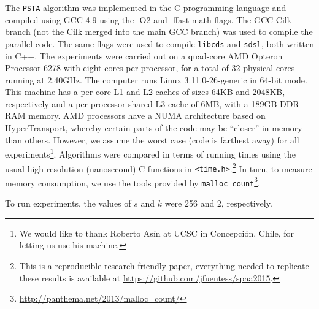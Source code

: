 The {\tt PSTA} algorithm was implemented in the C programming language
and compiled using GCC 4.9 using the -O2 and -ffast-math flags. The
GCC Cilk branch (not the Cilk merged into the main GCC branch) was
used to compile the parallel code. The same flags were used to compile
{\tt libcds} and {\tt sdsl}, both written in C++. The experiments were
carried out on a quad-core AMD Opteron\texttrademark{} Processor 6278
with eight cores per processor, for a total of 32 physical cores
running at 2.40GHz. The computer runs Linux 3.11.0-26-generic in
64-bit mode. This machine has a per-core L1 and L2 caches of sizes
64KB and 2048KB, respectively and a per-processor shared L3 cache of
6MB, with a 189GB DDR RAM memory. AMD processors have a NUMA
architecture based on HyperTransport, whereby certain parts of the
code may be ``closer'' in memory than others. However, we assume the
worst case (code is farthest away) for all experiments\footnote{We
would like to thank Roberto As\'in at UCSC in Concepci\'on, Chile, for
letting us use his machine.}. Algorithms were compared in terms of
running times using the usual high-resolution (nanosecond) C functions
in {\tt <time.h>}.\footnote{This is a reproducible-research-friendly
paper, everything needed to replicate these results is available at
\url{https://github.com/jfuentess/spaa2015}.} In turn, to measure
memory consumption, we use the tools provided by
\verb+malloc_count+\footnote{\url{http://panthema.net/2013/malloc_count/}}.

To run experiments, the values of $s$ and $k$ were 256 and 2, respectively.